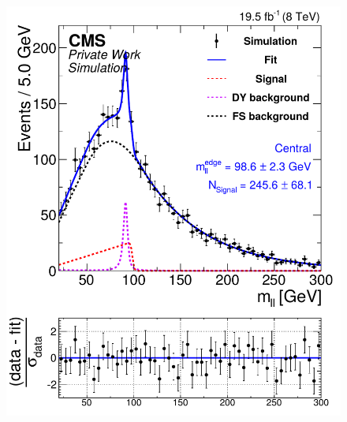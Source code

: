 \begin{figure}[hbp]
\begin{minipage}[t]{0.49\textwidth}
    \includegraphics[width=\textwidth]{plots/results/fit/mcFits/fit2012_ETHTriangle_SignalInclusive_Combined_Full2012_ETHTriangle_MC_SignalInjected_slepton_500_200_100_Central.pdf}
  \end{minipage}
  \begin{minipage}[t]{0.49\textwidth}

\end{minipage}
\end{figure}

